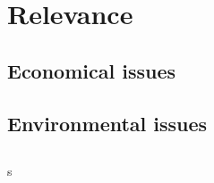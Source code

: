 \section{Relevance}

\subsection{Economical issues}

\subsection{Environmental issues}

\subsection{}s